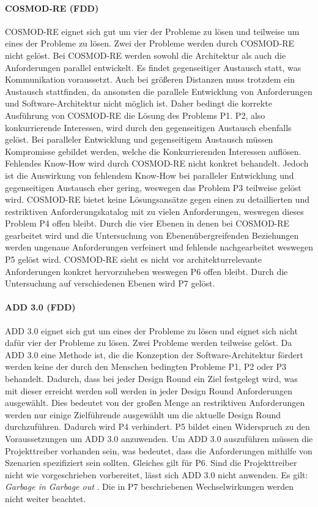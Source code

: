 \paragraph{COSMOD-RE (FDD)}
COSMOD-RE eignet sich gut um vier der Probleme zu l\"osen und teilweise um eines der Probleme zu l\"osen. Zwei der Probleme werden durch COSMOD-RE nicht gel\"ost. Bei COSMOD-RE werden sowohl die Architektur als auch die Anforderungen parallel entwickelt. Es findet gegenseitiger Austausch statt, was Kommunikation voraussetzt. Auch bei gr\"o\ss{}eren Distanzen muss trotzdem ein Austausch stattfinden, da ansonsten die parallele Entwicklung von Anforderungen und Software-Architektur nicht m\"oglich ist. Daher bedingt die korrekte Ausf\"uhrung von COSMOD-RE die L\"osung des Problems P1. P2, also konkurrierende Interessen, wird durch den gegenseitigen Austausch ebenfalls gel\"ost. Bei paralleler Entwicklung und gegenseitigem Austausch m\"ussen Kompromisse gebildet werden, welche die Konkurrierenden Interessen aufl\"osen. Fehlendes Know-How wird durch COSMOD-RE nicht konkret behandelt. Jedoch ist die Auswirkung von fehlendem Know-How bei paralleler Entwicklung und gegenseitigen Austausch eher gering, weswegen das Problem P3 teilweise gel\"ost wird. COSMOD-RE bietet keine L\"osungsans\"atze gegen einen zu detaillierten und restriktiven Anforderungskatalog mit zu vielen Anforderungen, weswegen dieses Problem P4 offen bleibt. Durch die vier Ebenen in denen bei COSMOD-RE gearbeitet wird und die Untersuchung von Ebenen\"ubergreifenden Beziehungen werden ungenaue Anforderungen verfeinert und fehlende nachgearbeitet weswegen P5 gel\"ost wird. COSMOD-RE sieht es nicht vor architekturrelevante Anforderungen konkret hervorzuheben weswegen P6 offen bleibt. Durch die Untersuchung auf verschiedenen Ebenen wird P7 gel\"ost.\\

\paragraph{ADD 3.0 (FDD)}
ADD 3.0 eignet sich gut um eines der Probleme zu l\"osen und eignet sich nicht daf\"ur vier der Probleme zu l\"osen. Zwei Probleme werden teilweise gel\"ost. Da ADD 3.0 eine Methode ist, die die Konzeption der Software-Architektur f\"ordert werden keine der durch den Menschen bedingten Probleme P1, P2 oder P3 behandelt. Dadurch, dass bei jeder Design Round ein Ziel festgelegt wird, was mit dieser erreicht werden soll werden in jeder Design Round Anforderungen ausgew\"ahlt. Dies bedeutet von der gro\ss{}en Menge an restriktiven Anforderungen werden nur einige Zielf\"uhrende ausgew\"ahlt um die aktuelle Design Round durchzuf\"uhren. Dadurch wird P4 verhindert. P5 bildet einen Widerspruch zu den Voraussetzungen um ADD 3.0 anzuwenden. Um ADD 3.0 auszuf\"uhren m\"ussen die Projekttreiber vorhanden sein, was bedeutet, dass die Anforderungen mithilfe von Szenarien spezifiziert sein sollten. Gleiches gilt f\"ur P6. Sind die Projekttreiber nicht wie vorgeschrieben vorbereitet, l\"asst sich ADD 3.0 nicht anwenden. Es gilt: \emph{Garbage in Garbage out }\cite{Cer01}. Die in P7 beschriebenen Wechselwirkungen werden nicht weiter beachtet.\\
